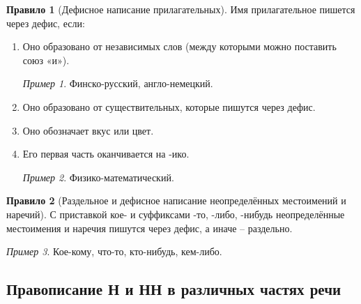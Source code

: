 \documentclass[12pt]{article}
\theoremstyle{definition}
\newtheorem{rrule}{Правило}[section]
\theoremstyle{remark}
\newtheorem*{example}{Пример}
\begin{document}
\begin{rrule}[Дефисное написание прилагательных] Имя прилагательное пишется через дефис, если:
    \begin{enumerate}
        \item Оно образовано от независимых слов (между которыми можно поставить союз «и»).
        \begin{example}
            Финско-русский, англо-немецкий.
        \end{example}
        \item Оно образовано от существительных, которые пишутся через дефис.
        \item Оно обозначает вкус или цвет.
        \item Его первая часть оканчивается на -ико.
        \begin{example}
            Физико-математический.
        \end{example}
    \end{enumerate}
\end{rrule}

\begin{rrule}[Раздельное и дефисное написание неопределённых местоимений и наречий]
    С приставкой кое- и суффиксами -то, -либо, -нибудь неопределённые местоимения и наречия пишутся через дефис, а иначе -- раздельно.
    \begin{example}
        Кое-кому, что-то, кто-нибудь, кем-либо.
    \end{example}
\end{rrule}

\subsection{Правописание Н и НН в различных частях речи}
\end{document}
